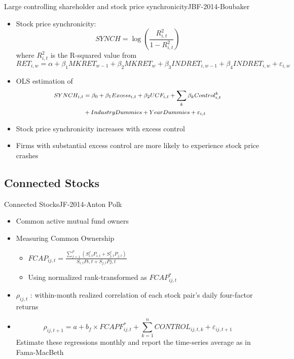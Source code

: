 \documentclass[handout]{beamer}
\begin{document}
	\begin{frame}{Large controlling shareholder and stock price synchronicity}{JBF-2014-Boubaker}
		\begin{itemize}
			\item Stock price synchronicity:
			\begin{equation*}
				SYNCH = \log(\frac{R^2_{i,t}}{1-R^2_{i,t}})
			\end{equation*}
			where $ R^2_{i,t} $ is the R-squared value from \footnotesize  $$ RET_{i,w} = \alpha + \beta_1 MKRET_{w-1} + \beta_2 MKRET_w + \beta_3 INDRET_{i,w-1} + \beta_4 INDRET_{i,w} + \varepsilon_{i,w} $$
			\normalsize  
			\item OLS estimation of 
			\begin{equation*}
				\footnotesize
				\begin{split}
					SYNCH_{i,t} & =  \beta_0 + \beta_1 Excess_{i,t} + \beta_2 UCF_{i,t} + \sum_k \beta_k Control^k_{i,t}\\
					& + IndustryDummies + YearDummies + \varepsilon_{i,t}
				\end{split}
			\end{equation*}
			
			\item Stock price synchronicity increases with excess control
			\item  Firms with substantial excess control are more likely to experience stock price crashes
			
		\end{itemize}
	\end{frame}
	
	\subsection{Connected Stocks}
	
	
	\begin{frame}{Connected Stocks}{JF-2014-Anton Polk}
		\begin{itemize}
			\item  Common active mutual fund owners
			\item  Measuring Common Ownership
			\begin{itemize}
				\item $ FCAP_{ij,t} = \frac{\sum_{f = 1}^{F} (S^f_{i,t}P_{i,t}+S^f_{j,t}P_{j,t})}{S_{i,t}P{i,t} + S_{j,t}P{j,t}} $
				\item Using normalized rank-transformed as $  FCAP_{ij,t} ^* $
			\end{itemize}
			\item $ \rho_{ij,t} $ :  within-month realized correlation of each stock pair’s daily four-factor returns 
			\item    \begin{equation*}
				\rho_{ij,t+1} = a + b_f \times FCAPF^*_{ij,t} + \sum_{k = 1}^{n } CONTROL_{ij,t,k} + \varepsilon_{ij,t+1}
				\label{e1}
			\end{equation*}
			Estimate these regressions monthly and report
			the time-series average as in Fama-MacBeth
			
		\end{itemize}
	\end{frame}
	
\end{document}
